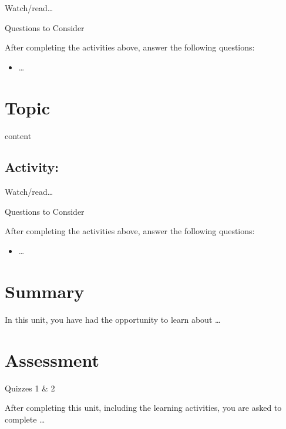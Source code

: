 \documentclass[
]{book}
\providecommand{\tightlist}{%
  \setlength{\itemsep}{0pt}\setlength{\parskip}{0pt}}
\theoremstyle{definition}
\theoremstyle{definition}
\theoremstyle{definition}
\theoremstyle{definition}
\theoremstyle{remark}
\begin{document}
\begin{reflect}
Watch/read\ldots{}

{Questions to Consider}

After completing the activities above, answer the following questions:

\begin{itemize}
\tightlist
\item
  \ldots{}
\end{itemize}
\end{reflect}

\hypertarget{topic-2}{%
\section{Topic}\label{topic-2}}

content

\hypertarget{activity-5}{%
\subsection*{Activity:}\label{activity-5}}

\begin{reflect}
Watch/read\ldots{}

{Questions to Consider}

After completing the activities above, answer the following questions:

\begin{itemize}
\tightlist
\item
  \ldots{}
\end{itemize}
\end{reflect}

\hypertarget{summary-1}{%
\section*{Summary}\label{summary-1}}

In this unit, you have had the opportunity to learn about \ldots{}

\hypertarget{assessment-1}{%
\section*{Assessment}\label{assessment-1}}

\begin{assessment}
{Quizzes 1 \& 2}

After completing this unit, including the learning activities, you are asked to complete \ldots{}
\end{assessment}
\end{document}
